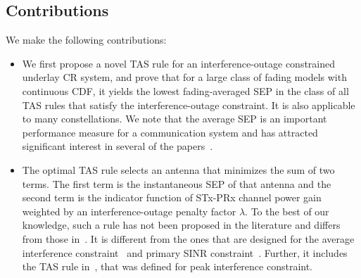 \documentclass[12pt,draftcls,peerreview,onecolumn]{IEEEtran}
\newcommand{\lam}{\lambda}
\begin{document}
\subsection{Contributions} 
We make the following contributions:
\begin{itemize}
\item We first propose a novel TAS rule for an interference-outage constrained underlay CR system, and prove that for a large class of fading models with continuous CDF, it yields the lowest fading-averaged SEP in the class of all TAS rules that satisfy the interference-outage constraint. It is also applicable to many constellations. We note that the average SEP is an important performance measure for a communication system and has attracted significant interest in several of the papers~\cite{Kashyap_2014_TCOM,Sarvendranath_2013_TCOM,li_2011_pimrc}. 
%
\item The optimal TAS rule selects an antenna that minimizes the sum of two terms. The first term is the instantaneous SEP of that antenna and the second term is the indicator function of STx-PRx channel power gain weighted by an interference-outage penalty factor $\lam$. To the best of our knowledge, such a rule has not been proposed in the literature and differs from those in~\cite{Hanif_2015_globecom,Sarvendranath_2013_TCOM,Wang_2011_TCom,Dmochowski_2011_CROWNCOM,Wang_2010_TWC}. It is different from the ones that are designed for the average interference constraint~\cite{Sarvendranath_2013_TCOM,Sarvendranath_2014_TCOM} and primary SINR constraint~\cite{Dmochowski_2011_CROWNCOM}. Further, it includes the TAS rule in~\cite{Hanif_2015_globecom}, that was defined for peak interference constraint. 
 

\end{itemize}
\end{document}
